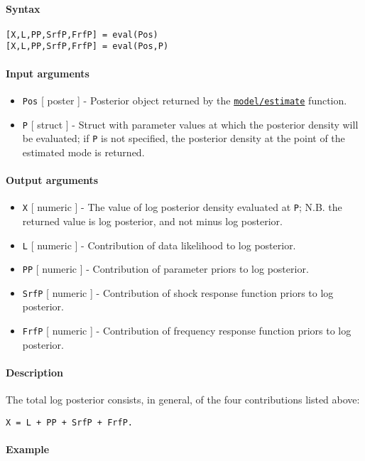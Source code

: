 


	\paragraph{Syntax}\label{syntax}

\begin{verbatim}
[X,L,PP,SrfP,FrfP] = eval(Pos)
[X,L,PP,SrfP,FrfP] = eval(Pos,P)
\end{verbatim}

\paragraph{Input arguments}\label{input-arguments}

\begin{itemize}
\item
  \texttt{Pos} {[} poster {]} - Posterior object returned by the
  \href{model/estimate}{\texttt{model/estimate}} function.
\item
  \texttt{P} {[} struct {]} - Struct with parameter values at which the
  posterior density will be evaluated; if \texttt{P} is not specified,
  the posterior density at the point of the estimated mode is returned.
\end{itemize}

\paragraph{Output arguments}\label{output-arguments}

\begin{itemize}
\item
  \texttt{X} {[} numeric {]} - The value of log posterior density
  evaluated at \texttt{P}; N.B. the returned value is log posterior, and
  not minus log posterior.
\item
  \texttt{L} {[} numeric {]} - Contribution of data likelihood to log
  posterior.
\item
  \texttt{PP} {[} numeric {]} - Contribution of parameter priors to log
  posterior.
\item
  \texttt{SrfP} {[} numeric {]} - Contribution of shock response
  function priors to log posterior.
\item
  \texttt{FrfP} {[} numeric {]} - Contribution of frequency response
  function priors to log posterior.
\end{itemize}

\paragraph{Description}\label{description}

The total log posterior consists, in general, of the four contributions
listed above:

\begin{verbatim}
X = L + PP + SrfP + FrfP.
\end{verbatim}

\paragraph{Example}\label{example}


